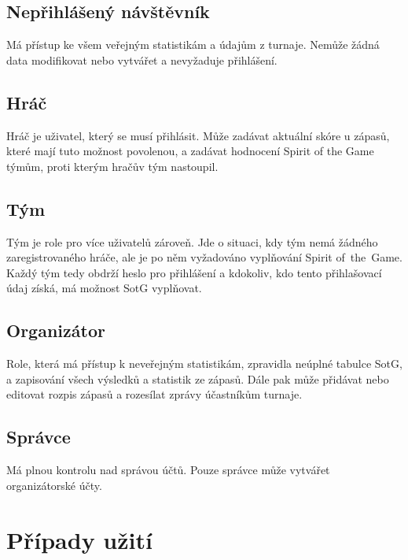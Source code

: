 \documentclass[thesis=B,czech]{FITthesis}[2012/06/26]
\begin{document}
\subsection{Nepřihlášený návštěvník}

\indent

Má přístup ke všem veřejným statistikám a údajům z turnaje. Nemůže žádná data modifikovat
nebo vytvářet a nevyžaduje přihlášení.

\subsection{Hráč}


\indent

Hráč je uživatel, který se musí přihlásit. Může zadávat aktuální skóre u zápasů,
které mají tuto možnost povolenou, a zadávat hodnocení Spirit of the Game týmům, proti kterým hračův tým nastoupil.

\subsection{Tým}

\indent

Tým je role pro více uživatelů zároveň. Jde o situaci, kdy tým nemá žádného zaregistrovaného hráče,
ale je po něm vyžadováno vyplňování Spirit of~the~Game. Každý tým tedy obdrží heslo pro přihlášení a kdokoliv,
kdo tento přihlašovací údaj získá, má možnost SotG vyplňovat.

\subsection{Organizátor}

\indent

Role, která má přístup k neveřejným statistikám, zpravidla neúplné tabulce SotG, a zapisování všech výsledků a statistik ze zápasů.
Dále pak může přidávat nebo editovat rozpis zápasů a rozesílat zprávy účastníkům turnaje.

\subsection{Správce}

\indent

Má plnou kontrolu nad správou účtů. Pouze správce může vytvářet organizátorské účty.

\section{Případy užití}
\end{document}
